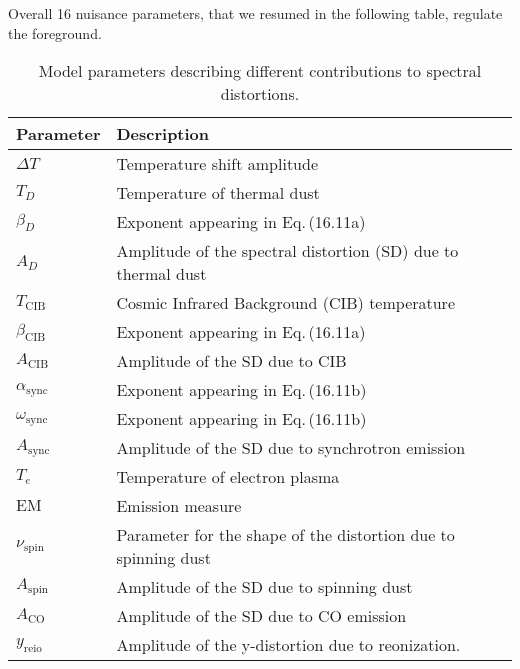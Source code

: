 Overall 16 nuisance parameters, that we resumed in the following table, regulate the foreground.
\begin{table}[h!]
\centering
\begin{tabularx}{\textwidth}{>{\raggedright\arraybackslash}m{2.5cm} X}
\hline
\textbf{Parameter} & \textbf{Description} \\
\hline
$\Delta T$      & Temperature shift amplitude \\
$T_D$           & Temperature of thermal dust \\
$\beta_D$       & Exponent appearing in Eq.\,(16.11a) \\
$A_D$           & Amplitude of the spectral distortion (SD) due to thermal dust \\
$T_{\text{CIB}}$& Cosmic Infrared Background (CIB) temperature \\
$\beta_{\text{CIB}}$ & Exponent appearing in Eq.\,(16.11a) \\
$A_{\text{CIB}}$ & Amplitude of the SD due to CIB \\
$\alpha_{\text{sync}}$ & Exponent appearing in Eq.\,(16.11b) \\
$\omega_{\text{sync}}$ & Exponent appearing in Eq.\,(16.11b) \\
$A_{\text{sync}}$ & Amplitude of the SD due to synchrotron emission \\
$T_e$           & Temperature of electron plasma \\
$\mathrm{EM}$   & Emission measure \\
$\nu_{\text{spin}}$ & Parameter for the shape of the distortion due to spinning dust \\
$A_{\text{spin}}$ & Amplitude of the SD due to spinning dust \\
$A_{\text{CO}}$ & Amplitude of the SD due to CO emission \\
$y_\text{reio}$ & Amplitude of the y-distortion due to reonization.\\
\hline
\end{tabularx}
\caption{Model parameters describing different contributions to spectral distortions.}
\end{table}

